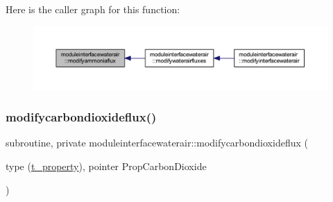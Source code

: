 Here is the caller graph for this function\+:\nopagebreak
\begin{figure}[H]
\begin{center}
\leavevmode
\includegraphics[width=350pt]{namespacemoduleinterfacewaterair_a8f1f7fa64a06041e2cb84a386c86e9e1_icgraph}
\end{center}
\end{figure}
\mbox{\label{namespacemoduleinterfacewaterair_a562697e89f9cb3b375137d30b5b565eb}} 
\subsubsection{\texorpdfstring{modifycarbondioxideflux()}{modifycarbondioxideflux()}}
{\footnotesize\ttfamily subroutine, private moduleinterfacewaterair\+::modifycarbondioxideflux (\begin{DoxyParamCaption}\item[{type (\mbox{\hyperlink{structmoduleinterfacewaterair_1_1t__property}{t\+\_\+property}}), pointer}]{Prop\+Carbon\+Dioxide }\end{DoxyParamCaption})\hspace{0.3cm}{\ttfamily [private]}}

